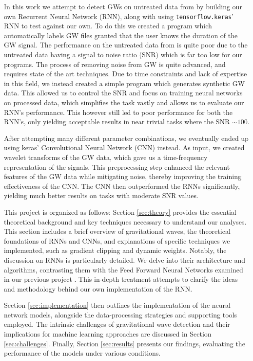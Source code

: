 \documentclass[%
reprint,
amsmath,amssymb,
aps,
]{revtex4-2}
\begin{document}
In this work we attempt to detect GWs on untreated data from \cite{gwosc} by building our own Recurrent Neural Network (RNN), along with using \texttt{tensorflow.keras}' RNN to test against our own. To do this we created a program which automatically labels GW files granted that the user knows the duration of the GW signal. The performance on the untreated data from \cite{gwosc} is quite poor due to the untreated data having a signal to noise ratio (SNR) which is far too low for our programs. The process of removing noise from GW is quite advanced, and requires state of the art techniques. Due to time constraints and lack of expertise in this field, we instead created a simple program which generates synthetic GW data. This allowed us to control the SNR and focus on training neural networks on processed data, which simplifies the task vastly and allows us to evaluate our RNN's performance. This however still led to poor performance for both the RNN's, only yielding acceptable results in near trivial tasks where the SNR $\sim100$. 

After attempting many different parameter combinations, we eventually ended up using keras' Convolutional Neural Network (CNN) instead. As input, we created wavelet transforms of the GW data, which gave us a time-frequency representation of the signals. This preprocessing step enhanced the relevant features of the GW data while mitigating noise, thereby improving the training effectiveness of the CNN. The CNN then outperformed the RNNs significantly, yielding much better results on tasks with moderate SNR values. 

This project is organized as follows: Section \ref{sec:theory} provides the essential theoretical background and key techniques necessary to understand our analyses. This section includes a brief overview of gravitational waves, the theoretical foundations of RNNs and CNNs, and explanations of specific techniques we implemented, such as gradient clipping and dynamic weights. Notably, the discussion on RNNs is particularly detailed. We delve into their architecture and algorithms, contrasting them with the Feed Forward Neural Networks examined in our previous project \cite{project2}. This in-depth treatment attempts to clarify the ideas and methodology behind our own implementation of the RNN.

Section \ref{sec:implementation} then outlines the implementation of the neural network models, alongside the data-processing strategies and supporting tools employed. The intrinsic challenges of gravitational wave detection and their implications for machine learning approaches are discussed in Section \ref{sec:challenges}. Finally, Section \ref{sec:results} presents our findings, evaluating the performance of the models under various conditions.
\end{document}
